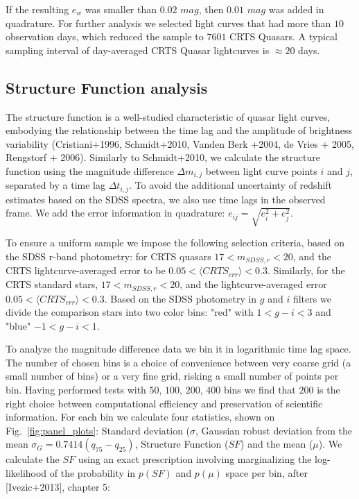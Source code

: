 \documentclass[a4paper,fleqn,usenatbib]{mnras}
\begin{document}
If the resulting $e_{w}$ was smaller than $0.02$ $mag$, then  $0.01$ $mag$ was added in quadrature. For further analysis we selected light curves that had more than $10$ observation days, which reduced the sample to $7601$ CRTS Quasars. A typical sampling interval of day-averaged CRTS Quasar lightcurves is $\approx 20$ days. 

\subsection{Structure Function analysis}

 The structure function is a well-studied characteristic of quasar light curves, embodying the relationship between the time lag and the amplitude of brightness variability (Cristiani+1996, Schmidt+2010, Vanden Berk +2004, de Vries + 2005, Rengstorf + 2006). Similarly to Schmidt+2010, we  calculate the structure function using  the magnitude difference $\Delta m _{i,j}$ between light curve points $i$ and $j$, separated by a time lag $\Delta t_{i,j}$. To avoid the additional uncertainty of redshift estimates based on the SDSS spectra, we also use time lags in the observed frame. We add the error information in quadrature: $e_{ij} = \sqrt{e_{i}^{2}+e_{j}^{2}}$.

To ensure a uniform sample we impose the following selection criteria, based on the SDSS r-band photometry: for CRTS quasars  $17< m_{SDSS,r} < 20$, and the CRTS lightcurve-averaged error to be  $0.05 < \langle CRTS_{err} \rangle < 0.3$. Similarly, for the CRTS standard stars, $17 < m_{SDSS,r} < 20 $, and the lightcurve-averaged error $0.05 < \langle CRTS_{err} \rangle < 0.3$. Based on the SDSS photometry in $g$ and $i$ filters  we divide the comparison stars into two color bins: "red" with   $1 < g-i < 3$ and "blue" $-1 < g-i < 1$. 

To analyze the magnitude difference data we bin it in logarithmic time lag space. The number of chosen bins is a choice of convenience between very coarse grid (a small number of bins) or a very fine grid, risking a small number of points per bin. Having performed tests  with $50$, $100$, $200$, $400$ bins we find that $200$ is the right choice between computational efficiency and preservation of scientific information. For each bin we calculate four statistics, shown on Fig.~\ref{fig:panel_plots}: Standard deviation ($\sigma$, Gaussian robust deviation from the mean $\sigma_{G}=0.7414 (q_{75}-q_{25})$, Structure Function ($SF$) and the mean ($\mu$).  We calculate the $SF$ using an exact prescription involving marginalizing the log-likelihood of the probability in $p(SF)$ and $p(\mu)$ space per bin, after [Ivezic+2013], chapter 5: 
 
\end{document}
